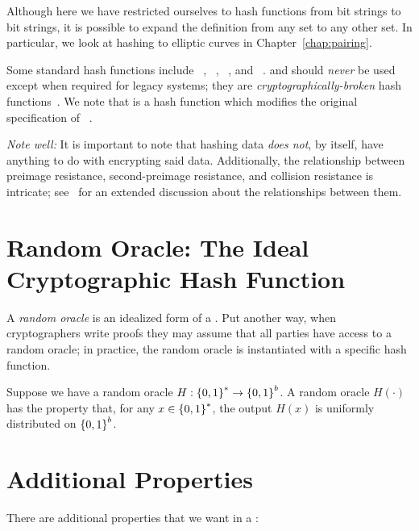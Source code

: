 Although here we have restricted ourselves to \glspl{hash function}
from bit strings to bit strings,
it is possible to expand the definition from any \gls{set} to
any other \gls{set}.
In particular, we look at hashing to \glspl{elliptic curve} in
Chapter~\ref{chap:pairing}.

Some standard \glspl{hash function} include \MDFive{}~\cite{rfc1321},
\ShaOne{}~\cite{FIPS-180-1-1995},
\ShaTwo{}~\cite{FIPS-180-4-2015},
and \ShaThree{}~\cite{FIPS-202}.
\MDFive{} and \ShaOne{} should \emph{never} be used except when required
for legacy systems;
they are \emph{cryptographically-broken}
\glspl{hash function}~\cite{rfc6151,rfc6194}.
We note that \ShaThree{} is a \gls{hash function} which modifies the original
specification of
\Keccak{}~\cite{KeccakSponge2011}.

\emph{Note well:} It is important to note that hashing data
\emph{does not}, by itself, have anything to do with encrypting
said data.
Additionally, the relationship between preimage resistance,
second-preimage resistance, and collision resistance is intricate;
see~\cite{cryptoeprint:2004:035} for an extended discussion about
the relationships between them.



\section{Random Oracle: The Ideal Cryptographic Hash Function}
\label{sec:random_oracle}

A \emph{\gls{random oracle}} is an idealized form of a
.
Put another way, when cryptographers write proofs they may
assume that all parties have access to a \gls{random oracle};
in practice, the \gls{random oracle} is instantiated with a specific
\gls{hash function}.

Suppose we have a \gls{random oracle} $H:\left\{ 0,1 \right\}^{*}\to\left\{ 0,1 \right\}^{b}$.
A \gls{random oracle} $H(\cdot)$ has the property that,
for any $x\in\left\{ 0,1 \right\}^{*}$,
the output $H(x)$ is uniformly distributed on $\left\{ 0,1 \right\}^{b}$.



\section{Additional Properties}
\label{sec:additional_hash_properties}

There are additional properties that we want in a :

